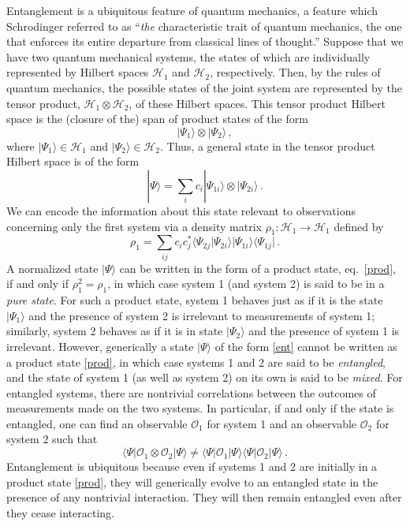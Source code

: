 \documentclass[12pt,nofootinbib,amsmath,amssymb,amsfonts,aps,prd,groupedaddress]{revtex4-1}
\newcommand{\be}{\begin{equation}} \newcommand{\ee}{\end{equation}}
\begin{document}
Entanglement is a ubiquitous feature of quantum mechanics, a feature which
Schrodinger \cite{schr} referred to as ``{\it the} characteristic trait of
quantum mechanics, the one that enforces its entire departure from classical
lines of thought.''  Suppose that we have two quantum mechanical systems, the
states of which are individually represented by Hilbert spaces ${\mathcal H}_1$
and ${\mathcal H}_2$, respectively. Then, by the rules of quantum mechanics, the
possible states of the joint system are represented by the tensor product,
${\mathcal H}_1 \otimes {\mathcal H}_2$, of these Hilbert spaces. This tensor
product Hilbert space is the (closure of the) span of product states of the form
\be | \Psi_1 \rangle \otimes  | \Psi_2 \rangle \, , \label{prod} \ee where $|
\Psi_1 \rangle \in {\mathcal H}_1$ and $| \Psi_2 \rangle \in {\mathcal H}_2$.
Thus, a general state in the tensor product Hilbert space is of the form \be |
\Psi \rangle = \sum_i c_i | \Psi_{1i} \rangle \otimes  | \Psi_{2i} \rangle \, .
\label{ent} \ee We can encode the information about this state relevant to
observations concerning only the first system via a density matrix $\rho_1 :
{\mathcal H}_1 \to {\mathcal H}_1$ defined by \be \rho_1 = \sum_{ij} c_i c_j^*
\langle \Psi_{2j}| \Psi_{2i} \rangle |\Psi_{1i} \rangle \langle \Psi_{1j}| \, .\ee A
normalized state $| \Psi \rangle$ can be written in the form of a product state,
eq.~\eqref{prod}, if and only if $\rho_1^2 = \rho_1$, in which case system 1 (and
system 2) is said to be in a {\it pure state}. For such a product state, system
1 behaves just as if it is the state $| \Psi_1 \rangle$ and the presence of
system 2 is irrelevant to measurements of system 1; similarly, system 2 behaves
as if it is in state $| \Psi_2 \rangle$ and the presence of system 1 is
irrelevant. However, generically a state $| \Psi \rangle$ of the form
\eqref{ent} cannot be written as a product state \eqref{prod}, in which case
systems 1 and 2 are said to be {\it entangled}, and the state of system 1 (as
well as system 2) on its own is said to be {\it mixed}. For entangled systems, there are
nontrivial correlations between the outcomes of measurements made on the two
systems.  In particular, if and only if the state is entangled, one can find an
observable ${\mathcal O}_1$ for system 1 and an observable ${\mathcal O}_2$ for
system 2 such that
 \be \langle \Psi | {\mathcal O}_1 \otimes {\mathcal O}_2 |
\Psi \rangle \neq \langle \Psi | {\mathcal O}_1 | \Psi \rangle \langle \Psi |
{\mathcal O}_2 | \Psi \rangle \, .  \label{entobs} \ee
Entanglement is
ubiquitous because even if systems 1 and 2 are initially in a product state
\eqref{prod}, they will generically evolve to an entangled state in the presence
of any nontrivial interaction. They will then remain entangled even after they
cease interacting.
\end{document}
